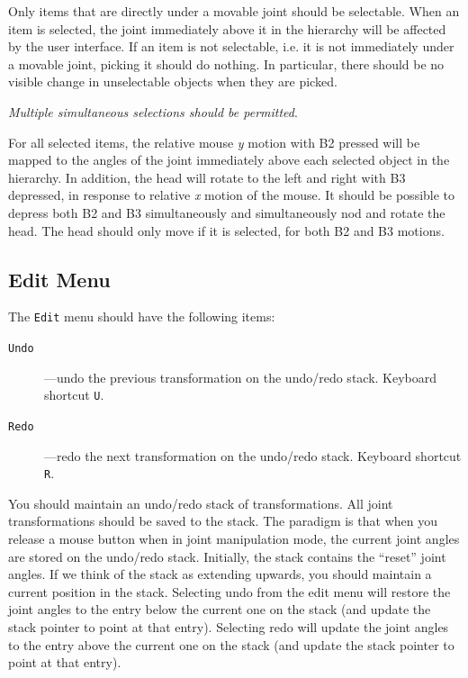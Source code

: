 \begin{description}
        Only items that are directly under a movable joint 
        should be selectable.   When an item is selected, the 
        joint immediately above it in the hierarchy will be affected
        by the user interface.    If an item is not selectable,
        i.e. it is not immediately under a movable joint,
        picking it should do nothing.   In particular, there should
        be no visible change in unselectable objects when they are 
        picked.  

	\emph{Multiple simultaneous selections should be permitted}.

	For all selected items, the
	relative mouse {\it y} motion with B2 pressed
	will be mapped to the angles of the joint immediately
        above each selected object in the hierarchy.  
        In addition, the head will rotate to the left and right
        with B3 depressed, in response to relative {\it x} motion of the mouse.
        It should be possible to depress both B2 and B3 simultaneously and
        simultaneously nod and rotate the head.
        The head should only move if it is selected, for both B2 and B3 
        motions.
\end{description}

\subsection{Edit Menu}
The {\tt Edit} menu should have the following items:
\begin{description}
	\item[{\tt Undo}]---undo the previous transformation on the
		undo/redo stack.
		Keyboard shortcut  \texttt{U}.
	\item[{\tt Redo}]---redo the next transformation on the
		undo/redo stack.
		Keyboard shortcut  \texttt{R}.
\end{description}

You should maintain an undo/redo stack of transformations.  All 
joint transformations should be saved to the stack.  The paradigm
is that when you release a mouse button when in joint manipulation
mode, the current joint angles are stored on the undo/redo stack.
Initially, the stack contains the ``reset'' joint angles.  
If we think of the stack as extending upwards, you should maintain
a current position in the stack.  Selecting
undo from the edit menu will restore the joint angles to the entry
below the current one on the stack (and update the stack pointer
to point at that entry).  Selecting redo will update the joint angles
to the entry above the current one on the stack (and update the
stack pointer to point at that entry).


